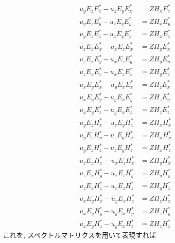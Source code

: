 \documentclass[a4j]{jsarticle}
\begin{document}
\begin{align}
u_{y}E_{z}E_{x}^{\ast}-u_{z}E_{y}E_{x}^{\ast}&=ZH_{x}E_{x}^{\ast}\nonumber\\
u_{y}E_{z}E_{y}^{\ast}-u_{z}E_{y}E_{y}^{\ast}&=ZH_{x}E_{y}^{\ast}\nonumber\\
u_{y}E_{z}E_{z}^{\ast}-u_{z}E_{y}E_{z}^{\ast}&=ZH_{x}E_{z}^{\ast}\nonumber\\
%
u_{z}E_{x}E_{x}^{\ast}-u_{x}E_{z}E_{x}^{\ast}&=ZH_{y}E_{x}^{\ast}\nonumber\\
u_{z}E_{x}E_{y}^{\ast}-u_{x}E_{z}E_{y}^{\ast}&=ZH_{y}E_{y}^{\ast}\nonumber\\
u_{z}E_{x}E_{z}^{\ast}-u_{x}E_{z}E_{z}^{\ast}&=ZH_{y}E_{z}^{\ast}\nonumber\\
%
u_{x}E_{y}E_{x}^{\ast}-u_{y}E_{x}E_{x}^{\ast}&=ZH_{z}E_{x}^{\ast}\nonumber\\
u_{x}E_{y}E_{y}^{\ast}-u_{y}E_{x}E_{y}^{\ast}&=ZH_{z}E_{y}^{\ast}\nonumber\\
u_{x}E_{y}E_{z}^{\ast}-u_{y}E_{x}E_{z}^{\ast}&=ZH_{z}E_{z}^{\ast}\nonumber\\
%
u_{y}E_{z}H_{x}^{\ast}-u_{z}E_{y}H_{x}^{\ast}&=ZH_{x}H_{x}^{\ast}\nonumber\\
u_{y}E_{z}H_{y}^{\ast}-u_{z}E_{y}H_{y}^{\ast}&=ZH_{x}H_{y}^{\ast}\nonumber\\
u_{y}E_{z}H_{z}^{\ast}-u_{z}E_{y}H_{z}^{\ast}&=ZH_{x}H_{z}^{\ast}\nonumber\\
%
u_{z}E_{x}H_{x}^{\ast}-u_{x}E_{z}H_{x}^{\ast}&=ZH_{y}H_{x}^{\ast}\nonumber\\
u_{z}E_{x}H_{y}^{\ast}-u_{x}E_{z}H_{y}^{\ast}&=ZH_{y}H_{y}^{\ast}\nonumber\\
u_{z}E_{x}H_{z}^{\ast}-u_{x}E_{z}H_{z}^{\ast}&=ZH_{y}H_{z}^{\ast}\nonumber\\
%
u_{x}E_{y}H_{x}^{\ast}-u_{y}E_{x}H_{x}^{\ast}&=ZH_{z}H_{x}^{\ast}\nonumber\\
u_{x}E_{y}H_{y}^{\ast}-u_{y}E_{x}H_{y}^{\ast}&=ZH_{z}H_{y}^{\ast}\nonumber\\
u_{x}E_{y}H_{z}^{\ast}-u_{y}E_{x}H_{z}^{\ast}&=ZH_{z}H_{z}^{\ast}\nonumber
\end{align}
これを, スペクトルマトリクスを用いて表現すれば
\end{document}

